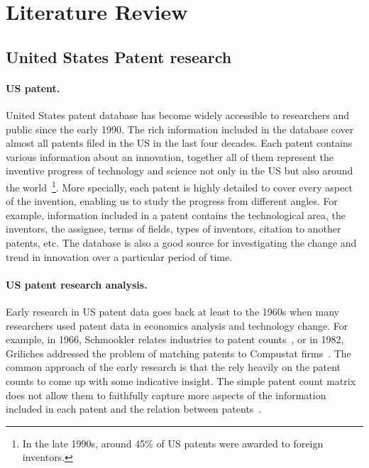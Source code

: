 \section{Literature Review}

\subsection{United States Patent research}

\paragraph{US patent.} United States patent database has become widely accessible to researchers and public since the early 1990. The rich information included in the database cover almost all patents filed in the US in the last four decades. Each patent contains various information about an innovation, together all of them represent the inventive progress of technology and science not only in the US but also around the world~\footnote{In the late 1990s, around 45\% of US patents were awarded to foreign inventors.}. More specially, each patent is highly detailed to cover every
aspect of the invention, enabling us to study the progress from different angles. For example, information included in a patent contains  the technological area, the inventors, the assignee,  terms of fields, types of inventors, citation to another patents, etc.
The database is also a good source  for investigating the change and trend in innovation over a particular period of time. 


\paragraph{US patent research analysis.} Early research in US patent data goes
back at least to the 1960s when many researchers used patent data in economics
analysis and technology change. For example, in 1966,  Schmookler relates
industries to patent counts~\cite{Schmookler1966}, or in 1982, Griliches
addressed the problem of matching patents to Compustat
firms~\cite{Griliches1982}. The common approach of the early research is that
the rely heavily on the patent counts to come up with some indicative insight.
The simple patent count matrix does not allow them to faithfully capture more
aspects of the information included in each patent and the relation between
patents~\cite{Griliches1987}.

